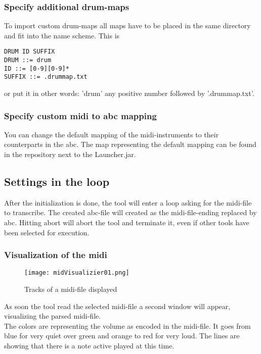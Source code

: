\documentclass[10pt,a4paper,oneside]{article}
\begin{document}
\subsubsection{Specify additional drum-maps}
To import custom drum-maps all maps have to be placed in the same directory and fit into the name scheme. This is
\begin{verbatim}
DRUM ID SUFFIX
DRUM ::= drum
ID ::= [0-9][0-9]*
SUFFIX ::= .drummap.txt
\end{verbatim} or put it in other words: 'drum' any positive number followed by '.drummap.txt'.

\subsubsection{Specify custom midi to abc mapping}
You can change the default mapping of the midi-instruments to their counterparts in the abc. The map representing the default mapping can be found in the repository next to the Launcher.jar.

\subsection{Settings in the loop}
After the initialization is done, the tool will enter a loop asking for the midi-file to transcribe. The created abc-file will created as the midi-file-ending replaced by abc. Hitting abort will abort the tool and terminate it, even if other tools have been selected for execution.

\subsubsection{Visualization of the midi}
\begin{figure}[h]
\texttt{[image: midVisualizier01.png]} 
\caption{Tracks of a midi-file displayed}
\end{figure}
As soon the tool read the selected midi-file a second window will appear, visualizing the parsed midi-file. \\
The colors are representing the volume as encoded in the midi-file. It goes from blue for very quiet over green and orange to red for very loud. The lines are showing that there is a note active played at this time.
\end{document}

